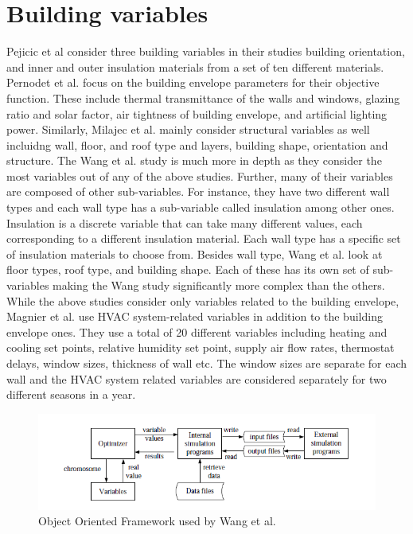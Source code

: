 \section{Building variables}\label{sec:variables}

Pejicic et al consider three building variables in their studies \textemdash building orientation, and inner and outer insulation materials from a set of ten different materials. Pernodet et al. \cite{Pernodet2009} focus on the building envelope parameters for their objective function. These include thermal transmittance of the walls and windows, glazing ratio and solar factor, air tightness of building envelope, and artificial lighting power. Similarly, Milajec et al. mainly consider structural variables as well incluidng wall, floor, and roof type and layers, building shape, orientation and structure. The Wang et al. study is much more in depth as they consider the most variables out of any of the above studies. Further, many of their variables are composed of other sub-variables. For instance, they have two different wall types and each wall type has a sub-variable called insulation among other ones. Insulation is a discrete variable that can take many different values, each corresponding to a different insulation material. Each wall type has a specific set of insulation materials to choose from. Besides wall type, Wang et al. look at floor types, roof type, and building shape. Each of these has its own set of sub-variables making the Wang study significantly more complex than the others. While the above studies consider only variables related to the building envelope, Magnier et al. use HVAC system-related variables in addition to the building envelope ones. They use a total of 20 different variables including heating and cooling set points, relative humidity set point, supply air flow rates, thermostat delays, window sizes, thickness of wall etc. The window sizes are separate for each wall and the HVAC system related variables are considered separately for two different seasons in a year. 


\begin{figure}[htbp]
\centering
\includegraphics[width=\linewidth]{images/ooframework.png}
\caption{Object Oriented Framework used by Wang et al. \cite{Wang2005b}}
\label{fig:wang}
\end{figure}

